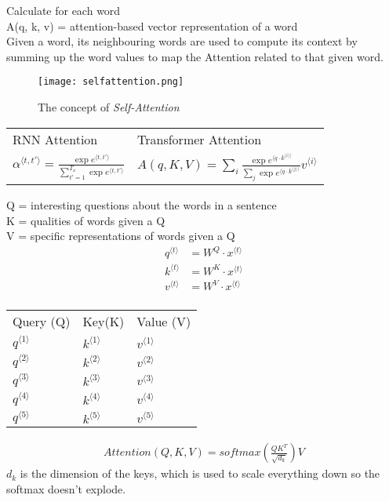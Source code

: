Calculate for each word\\
A(q, k, v) = attention-based vector representation of a word\\
Given a word, its neighbouring words are used to compute its context by summing up the word values to map the Attention related to that given word.
\begin{figure}[h]
    \centering
    \texttt{[image: selfattention.png]}
    \caption{The concept of \textit{Self-Attention}}
    \label{fig:selfattention.}
\end{figure}

\begin{center}
\begin{tabular}{ m{6cm}  m{8cm}  }
RNN Attention & Transformer Attention\\
$\displaystyle \alpha^{\langle t, t' \rangle} = \frac{\exp{e^{\langle t, t' \rangle}}}{\sum_{t' = 1}^{T_x} \exp{e^{\langle t, t' \rangle}}}$ &
$\displaystyle A(q, K, V) = \sum_i \frac{\exp{e^{\langle q \cdot k^{\langle i \rangle \rangle}}}}{\sum_{j}\exp{e^{\langle q \cdot k^{\langle j \rangle \rangle}}}} v^{\langle i \rangle}$\\
\end{tabular}
\end{center}
Q = interesting questions about the words in a sentence\\
K = qualities of words given a Q\\
V = specific representations of words given a Q
\begin{align*}
q^{\langle t \rangle} &= W^Q \cdot x^{\langle t \rangle}\\
k^{\langle t \rangle} &= W^K \cdot x^{\langle t \rangle}\\
v^{\langle t \rangle} &= W^V \cdot x^{\langle t \rangle}\\
\end{align*}

\begin{center}
\begin{tabular}{ m{2cm}  m{2cm}  m{2cm}}
Query (Q) & Key(K) & Value (V)\\
$q^{\langle 1 \rangle}$ & $k^{\langle 1 \rangle}$ & $v^{\langle 1 \rangle}$\\
$q^{\langle 2 \rangle}$ & $k^{\langle 2 \rangle}$ & $v^{\langle 2 \rangle}$\\
$q^{\langle 3 \rangle}$ & $k^{\langle 3 \rangle}$ & $v^{\langle 3 \rangle}$\\
$q^{\langle 4 \rangle}$ & $k^{\langle 4 \rangle}$ & $v^{\langle 4 \rangle}$\\
$q^{\langle 5 \rangle}$ & $k^{\langle 5 \rangle}$ & $v^{\langle 5 \rangle}$\\
\end{tabular}
\end{center}
\begin{align}
Attention(Q, K, V) = softmax(\frac{QK^T}{\sqrt{d_k}})V
\end{align}
$d_k$ is the dimension of the keys, which is used to scale everything down so the softmax doesn't explode.

